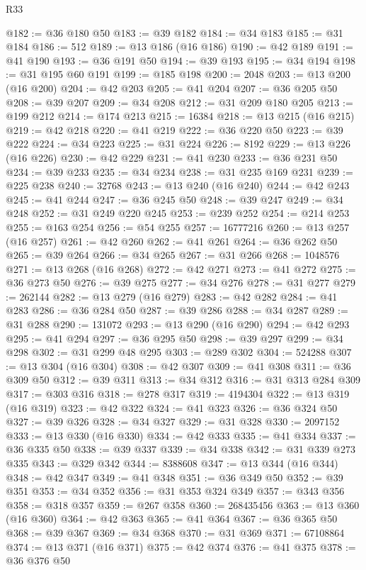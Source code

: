 \begin{lexlean}{R33}
\begin{coremodule}
@182 := @36 @180 @50
@183 := @39 @182
@184 := @34 @183
@185 := @31 @184
@186 := 512
@189 := @13 @186 (@16 @186)
@190 := @42 @189
@191 := @41 @190
@193 := @36 @191 @50
@194 := @39 @193
@195 := @34 @194
@198 := @31 @195 @60 @191
@199 := @185 @198
@200 := 2048
@203 := @13 @200 (@16 @200)
@204 := @42 @203
@205 := @41 @204
@207 := @36 @205 @50
@208 := @39 @207
@209 := @34 @208
@212 := @31 @209 @180 @205
@213 := @199 @212
@214 := @174 @213
@215 := 16384
@218 := @13 @215 (@16 @215)
@219 := @42 @218
@220 := @41 @219
@222 := @36 @220 @50
@223 := @39 @222
@224 := @34 @223
@225 := @31 @224
@226 := 8192
@229 := @13 @226 (@16 @226)
@230 := @42 @229
@231 := @41 @230
@233 := @36 @231 @50
@234 := @39 @233
@235 := @34 @234
@238 := @31 @235 @169 @231
@239 := @225 @238
@240 := 32768
@243 := @13 @240 (@16 @240)
@244 := @42 @243
@245 := @41 @244
@247 := @36 @245 @50
@248 := @39 @247
@249 := @34 @248
@252 := @31 @249 @220 @245
@253 := @239 @252
@254 := @214 @253
@255 := @163 @254
@256 := @54 @255
@257 := 16777216
@260 := @13 @257 (@16 @257)
@261 := @42 @260
@262 := @41 @261
@264 := @36 @262 @50
@265 := @39 @264
@266 := @34 @265
@267 := @31 @266
@268 := 1048576
@271 := @13 @268 (@16 @268)
@272 := @42 @271
@273 := @41 @272
@275 := @36 @273 @50
@276 := @39 @275
@277 := @34 @276
@278 := @31 @277
@279 := 262144
@282 := @13 @279 (@16 @279)
@283 := @42 @282
@284 := @41 @283
@286 := @36 @284 @50
@287 := @39 @286
@288 := @34 @287
@289 := @31 @288
@290 := 131072
@293 := @13 @290 (@16 @290)
@294 := @42 @293
@295 := @41 @294
@297 := @36 @295 @50
@298 := @39 @297
@299 := @34 @298
@302 := @31 @299 @48 @295
@303 := @289 @302
@304 := 524288
@307 := @13 @304 (@16 @304)
@308 := @42 @307
@309 := @41 @308
@311 := @36 @309 @50
@312 := @39 @311
@313 := @34 @312
@316 := @31 @313 @284 @309
@317 := @303 @316
@318 := @278 @317
@319 := 4194304
@322 := @13 @319 (@16 @319)
@323 := @42 @322
@324 := @41 @323
@326 := @36 @324 @50
@327 := @39 @326
@328 := @34 @327
@329 := @31 @328
@330 := 2097152
@333 := @13 @330 (@16 @330)
@334 := @42 @333
@335 := @41 @334
@337 := @36 @335 @50
@338 := @39 @337
@339 := @34 @338
@342 := @31 @339 @273 @335
@343 := @329 @342
@344 := 8388608
@347 := @13 @344 (@16 @344)
@348 := @42 @347
@349 := @41 @348
@351 := @36 @349 @50
@352 := @39 @351
@353 := @34 @352
@356 := @31 @353 @324 @349
@357 := @343 @356
@358 := @318 @357
@359 := @267 @358
@360 := 268435456
@363 := @13 @360 (@16 @360)
@364 := @42 @363
@365 := @41 @364
@367 := @36 @365 @50
@368 := @39 @367
@369 := @34 @368
@370 := @31 @369
@371 := 67108864
@374 := @13 @371 (@16 @371)
@375 := @42 @374
@376 := @41 @375
@378 := @36 @376 @50

\end{coremodule}
\end{lexlean}
